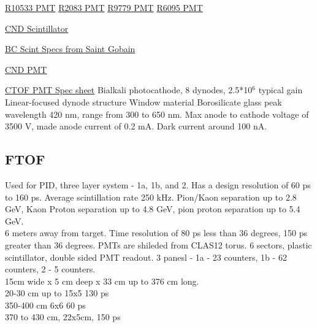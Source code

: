             
            
            \href{https://www.hamamatsu.com/eu/en/product/type/R10533/index.html}{R10533 PMT}
            \href{https://www.hamamatsu.com/eu/en/product/type/R2083/index.html}{R2083 PMT}
            \href{https://pdf1.alldatasheet.com/datasheet-pdf/view/212324/HAMAMATSU/R9779.html}{R9779 PMT}
            \href{https://www.sphere.bc.ca/test/phototubes2/ham/r6095.pdf}{R6095 PMT}
            
            
            
            
            
            
            
            
            
            \href{https://eljentechnology.com/products/plastic-scintillators/ej-200-ej-204-ej-208-ej-212}{CND Scintillator}
            
            
            \href{https://www.crystals.saint-gobain.com/sites/imdf.crystals.com/files/documents/bc400-404-408-412-416-data-sheet.pdf}{BC Scint Specs from Saint Gobain}
            
            
            \href{https://www.hamamatsu.com/eu/en/product/type/R10533/index.html}{CND PMT}
            
            
            \href{https://www.hamamatsu.com/us/en/product/type/R2083/index.html}{CTOF PMT Spec sheet}
            Bialkali photocathode, 8 dynodes, 2.5*10$^6$ typical gain
            Linear-focused dynode structure
            Window material Borosilicate glass
            peak wavelength 420 nm, range from 300 to 650 nm. Max anode to cathode voltage of 3500 V, made anode current of 0.2 mA. Dark current around 100 nA. 
            
            
        
        \subsection{FTOF}
            Used for PID, three layer system - 1a, 1b, and 2. Has a design resolution of 60 ps to 160 ps. Average scintillation rate 250 kHz. Pion/Kaon separation up to 2.8 GeV, Kaon Proton separation up to 4.8 GeV, pion proton separation up to 5.4 GeV. \\
            6 meters away from target.
            Time resolution of 80 ps less than 36 degrees, 150 ps greater than 36 degrees. PMTs are shileded from CLAS12 torus. 6 sectors, plastic scintillator, double sided PMT readout. 3 panesl - 1a - 23 counters, 1b - 62 counters, 2 - 5 counters. \\
            15cm wide x 5 cm deep x 33 cm up to 376 cm long.\\
            20-30 cm up to 15x5 130 ps\\
            350-400 cm 6x6 60 ps\\
            370 to 430 cm, 22x5cm, 150 ps\\
            
